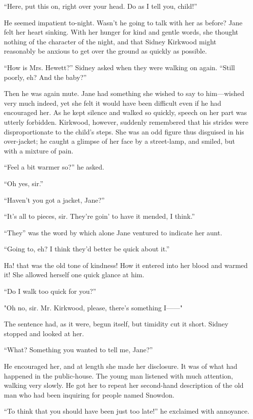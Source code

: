 ``Here, put this on, right over your head. Do as I tell you, child!''

He seemed impatient to-night. Wasn't he going to talk with her as
before? Jane felt her heart sinking. With her hunger for kind and gentle
words, she thought nothing of the character of the night, and that
Sidney Kirkwood might reasonably be anxious to get over the ground as
quickly as possible.

{}``How is Mrs. Hewett?'' Sidney asked when they were walking on again.
``Still poorly, eh? And the baby?''

Then he was again mute. Jane had something she wished to say to
him---wished very much indeed, yet she felt it would have been difficult
even if he had encouraged her. As he kept silence and walked so quickly,
speech on her part was utterly forbidden. Kirkwood, however, suddenly
remembered that his strides were disproportionate to the child's steps.
She was an odd figure thus disguised in his over-jacket; he caught a
glimpse of her face by a street-lamp, and smiled, but with a mixture of
pain.

``Feel a bit warmer so?'' he asked.

``Oh yes, sir.''

``Haven't you got a jacket, Jane?''

``It's all to pieces, sir. They're goin' to have it mended, I think.''

``They'' was the word by which alone Jane ventured to indicate her aunt.

``Going to, eh? I think they'd better be quick about it.''

{}Ha! that was the old tone of kindness! How it entered into her blood
and warmed it! She allowed herself one quick glance at him.

``Do I walk too quick for you?''

"Oh no, sir. Mr. Kirkwood, please, there's something I{{------}}"

The sentence had, as it were, begun itself, but timidity cut it short.
Sidney stopped and looked at her.

``What? Something you wanted to tell me, Jane?''

He encouraged her, and at length she made her disclosure. It was of what
had happened in the public-house. The young man listened with much
attention, walking very slowly. He got her to repeat her second-hand
description of the old man who had been inquiring for people named
Snowdon.

``To think that you should have been just too late!'' he exclaimed with
annoyance.

